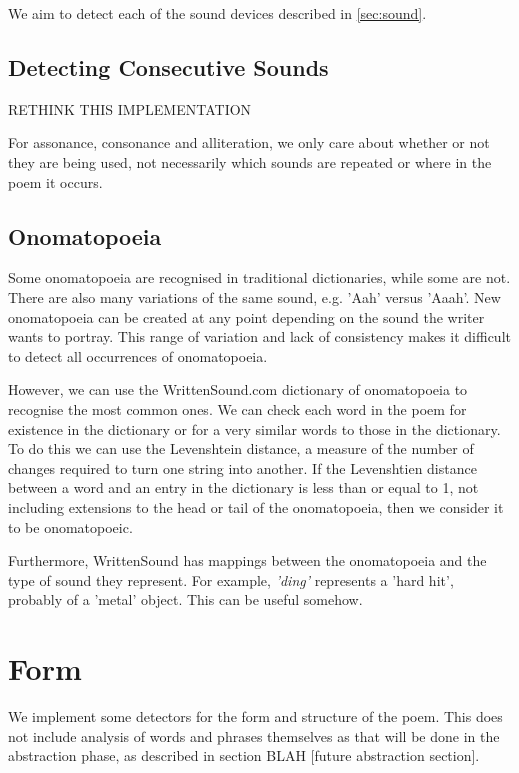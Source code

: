 We aim to detect each of the sound devices described in \ref{sec:sound}.

\subsection{Detecting Consecutive Sounds}

RETHINK THIS IMPLEMENTATION

For assonance, consonance and alliteration, we only care about whether or not they are being used, not necessarily which sounds are repeated or where in the poem it occurs.

\subsection{Onomatopoeia}

Some onomatopoeia are recognised in traditional dictionaries, while some are not. There are also many variations of the same sound, e.g. 'Aah' versus 'Aaah'. New onomatopoeia can be created at any point depending on the sound the writer wants to portray. This range of variation and lack of consistency makes it difficult to detect all occurrences of onomatopoeia.

However, we can use the WrittenSound.com dictionary of onomatopoeia to recognise the most common ones. We can check each word in the poem for existence in the dictionary or for a very similar words to those in the dictionary. To do this we can use the Levenshtein distance, a measure of the number of changes required to turn one string into another. If the Levenshtien distance between a word and an entry in the dictionary is less than or equal to 1, not including extensions to the head or tail of the onomatopoeia, then we consider it to be onomatopoeic.

Furthermore, WrittenSound has mappings between the onomatopoeia and the type of sound they represent. For example, \textit{'ding'} represents a 'hard hit', probably of a 'metal' object. This can be useful somehow.


\section{Form}

We implement some detectors for the form and structure of the poem. This does not include analysis of words and phrases themselves as that will be done in the abstraction phase, as described in section BLAH [future abstraction section].

